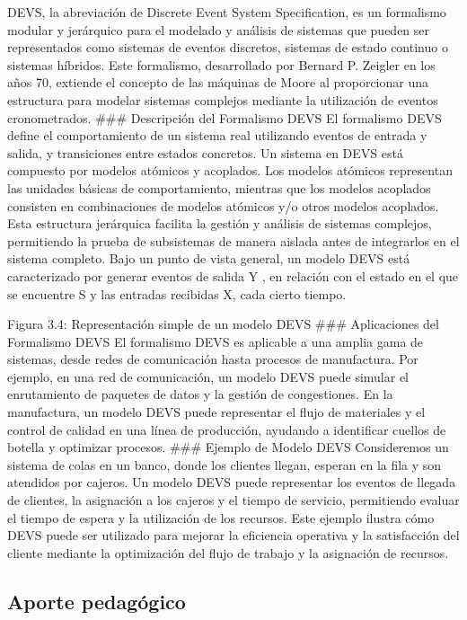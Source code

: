 \documentclass[12pt,twoside]{templates/unerthesis}
\begin{document}
DEVS, la abreviación de Discrete Event System Specification, es un formalismo modular y jerárquico para el modelado y análisis de sistemas que pueden ser representados como sistemas de eventos discretos, sistemas de estado continuo o sistemas híbridos. Este formalismo, desarrollado por Bernard P. Zeigler en los años 70, extiende el concepto de las máquinas de Moore al proporcionar una estructura para modelar sistemas complejos mediante la utilización de eventos cronometrados.
\#\#\# Descripción del Formalismo DEVS
El formalismo DEVS define el comportamiento de un sistema real utilizando eventos de entrada y salida, y transiciones entre estados concretos. Un sistema en DEVS está compuesto por modelos atómicos y acoplados. Los modelos atómicos representan las unidades básicas de comportamiento, mientras que los modelos acoplados consisten en combinaciones de modelos atómicos y/o otros modelos acoplados. Esta estructura jerárquica facilita la gestión y análisis de sistemas complejos, permitiendo la prueba de subsistemas de manera aislada antes de integrarlos en el sistema completo.
Bajo un punto de vista general, un modelo DEVS está caracterizado por generar eventos de salida Y , en relación con el estado en el que se encuentre S y las entradas recibidas X, cada cierto tiempo.

Figura 3.4: Representación simple de un modelo DEVS
\#\#\# Aplicaciones del Formalismo DEVS
El formalismo DEVS es aplicable a una amplia gama de sistemas, desde redes de comunicación hasta procesos de manufactura. Por ejemplo, en una red de comunicación, un modelo DEVS puede simular el enrutamiento de paquetes de datos y la gestión de congestiones. En la manufactura, un modelo DEVS puede representar el flujo de materiales y el control de calidad en una línea de producción, ayudando a identificar cuellos de botella y optimizar procesos.
\#\#\# Ejemplo de Modelo DEVS
Consideremos un sistema de colas en un banco, donde los clientes llegan, esperan en la fila y son atendidos por cajeros. Un modelo DEVS puede representar los eventos de llegada de clientes, la asignación a los cajeros y el tiempo de servicio, permitiendo evaluar el tiempo de espera y la utilización de los recursos. Este ejemplo ilustra cómo DEVS puede ser utilizado para mejorar la eficiencia operativa y la satisfacción del cliente mediante la optimización del flujo de trabajo y la asignación de recursos.

\hypertarget{aporte-pedaguxf3gico}{%
\subsection{Aporte pedagógico}\label{aporte-pedaguxf3gico}}
\end{document}
